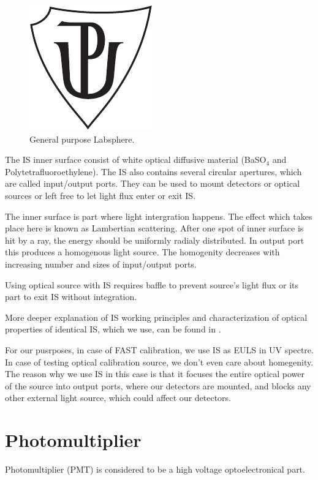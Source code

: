 \begin{figure}[H]
 \includegraphics{up_logo_bw}
 \caption{General purpose Labsphere.}
 \label{Labsphere}
 
\end{figure}
\par
The IS inner surface consist of white optical diffusive material (BaSO$_4$ and Polytetrafluoroethylene). The IS also contains several circular apertures, which are called input/output ports. They can be used to mount detectors or optical sources or left free to let light flux enter or exit IS. 
\par
The inner surface is part where light intergration happens. The effect which takes place here is known as Lambertian scattering. After one spot of inner surface is hit by a ray, the energy should be uniformly radialy distributed. In output port this produces a homogenous light source. The homogenity decreases with increasing number and sizes of input/output ports.
\par
Using optical source with IS requires baffle to prevent source's light flux or its part to exit IS without integration.
\par
More deeper explanation of IS working principles and characterization of optical properties of identical IS, which we use, can be found in \cite{VACULA2021167169}.
\par
For our pusrposes, in case of FAST calibration, we use IS as EULS in UV spectre. In case of testing optical calibration source, we don't even care about homegenity. The reason why we use IS in this case is that it focuses the entire optical power of the source into output ports, where  our detectors are mounted, and blocks any other external light source, which could affect our detectors.

\section{Photomultiplier}
Photomultiplier (PMT) is considered to be a high voltage optoelectronical part.

